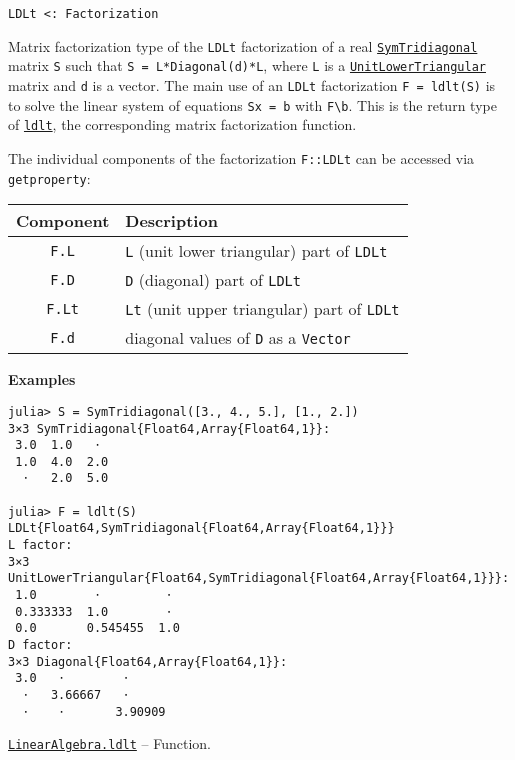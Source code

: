 \begin{adjustwidth}{2em}{0pt}


\begin{verbatim}
LDLt <: Factorization
\end{verbatim}

Matrix factorization type of the \texttt{LDLt} factorization of a real \hyperlink{6062797780727203318}{\texttt{SymTridiagonal}} matrix \texttt{S} such that \texttt{S = L*Diagonal(d)*L{\textquotesingle}}, where \texttt{L} is a \hyperlink{2163321084999097240}{\texttt{UnitLowerTriangular}} matrix and \texttt{d} is a vector. The main use of an \texttt{LDLt} factorization \texttt{F = ldlt(S)} is to solve the linear system of equations \texttt{Sx = b} with \texttt{F{\textbackslash}b}. This is the return type of \hyperlink{8934377864822491393}{\texttt{ldlt}}, the corresponding matrix factorization function.

The individual components of the factorization \texttt{F::LDLt} can be accessed via \texttt{getproperty}:


\begin{table}[h]

\begin{tabulary}{\linewidth}{|C|L|}
\hline
Component & Description \\
\hline
\texttt{F.L} & \texttt{L} (unit lower triangular) part of \texttt{LDLt} \\
\hline
\texttt{F.D} & \texttt{D} (diagonal) part of \texttt{LDLt} \\
\hline
\texttt{F.Lt} & \texttt{Lt} (unit upper triangular) part of \texttt{LDLt} \\
\hline
\texttt{F.d} & diagonal values of \texttt{D} as a \texttt{Vector} \\
\hline
\end{tabulary}

\end{table}

\textbf{Examples}


\begin{verbatim}
julia> S = SymTridiagonal([3., 4., 5.], [1., 2.])
3×3 SymTridiagonal{Float64,Array{Float64,1}}:
 3.0  1.0   ⋅
 1.0  4.0  2.0
  ⋅   2.0  5.0

julia> F = ldlt(S)
LDLt{Float64,SymTridiagonal{Float64,Array{Float64,1}}}
L factor:
3×3 UnitLowerTriangular{Float64,SymTridiagonal{Float64,Array{Float64,1}}}:
 1.0        ⋅         ⋅
 0.333333  1.0        ⋅
 0.0       0.545455  1.0
D factor:
3×3 Diagonal{Float64,Array{Float64,1}}:
 3.0   ⋅        ⋅
  ⋅   3.66667   ⋅
  ⋅    ⋅       3.90909
\end{verbatim}



\end{adjustwidth}
\hypertarget{8934377864822491393}{} 
\hyperlink{8934377864822491393}{\texttt{LinearAlgebra.ldlt}}  -- {Function.}

